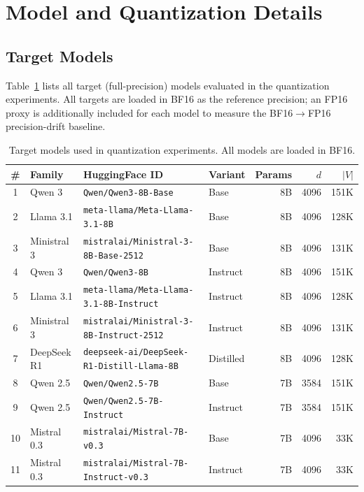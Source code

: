 
\section{Model and Quantization Details}
\label{app:model_details}

\subsection{Target Models}

Table~\ref{tab:target_models} lists all target (full-precision) models evaluated in the quantization experiments.
All targets are loaded in BF16 as the reference precision; an FP16 proxy is additionally included for each model to measure the BF16$\to$FP16 precision-drift baseline.

\begin{table}[h]
\centering
\caption{Target models used in quantization experiments. All models are loaded in BF16.}
\label{tab:target_models}
\small
\begin{tabular}{@{}clllrrr@{}}
\toprule
\# & Family & HuggingFace ID & Variant & Params & $d$ & $|V|$ \\
\midrule
1  & Qwen 3     & \texttt{Qwen/Qwen3-8B-Base}                         & Base      & 8B   & 4096 & 151K \\
2  & Llama 3.1  & \texttt{meta-llama/Meta-Llama-3.1-8B}               & Base      & 8B   & 4096 & 128K \\
3  & Ministral 3 & \texttt{mistralai/Ministral-3-8B-Base-2512}         & Base      & 8B   & 4096 & 131K \\
4  & Qwen 3     & \texttt{Qwen/Qwen3-8B}                              & Instruct  & 8B   & 4096 & 151K \\
5  & Llama 3.1  & \texttt{meta-llama/Meta-Llama-3.1-8B-Instruct}      & Instruct  & 8B   & 4096 & 128K \\
6  & Ministral 3 & \texttt{mistralai/Ministral-3-8B-Instruct-2512}    & Instruct  & 8B   & 4096 & 131K \\
7  & DeepSeek R1 & \texttt{deepseek-ai/DeepSeek-R1-Distill-Llama-8B} & Distilled & 8B   & 4096 & 128K \\
8  & Qwen 2.5   & \texttt{Qwen/Qwen2.5-7B}                           & Base      & 7B   & 3584 & 151K \\
9  & Qwen 2.5   & \texttt{Qwen/Qwen2.5-7B-Instruct}                  & Instruct  & 7B   & 3584 & 151K \\
10 & Mistral 0.3 & \texttt{mistralai/Mistral-7B-v0.3}                 & Base      & 7B   & 4096 & 33K  \\
11 & Mistral 0.3 & \texttt{mistralai/Mistral-7B-Instruct-v0.3}        & Instruct  & 7B   & 4096 & 33K  \\
\bottomrule
\end{tabular}
\end{table}

